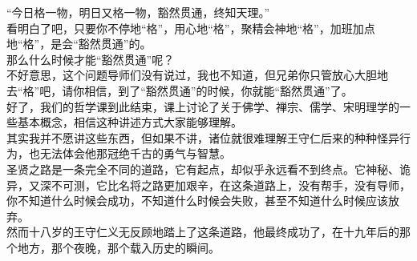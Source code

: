 \begin{multicols}{\theparacolNo}
“今日格一物，明日又格一物，豁然贯通，终知天理。”\\

看明白了吧，只要你不停地“格”，用心地“格”，聚精会神地“格”，加班加点地“格”，是会“豁然贯通”的。\\

那么什么时候才能“豁然贯通”呢？\\

不好意思，这个问题导师们没有说过，我也不知道，但兄弟你只管放心大胆地去“格”吧，请你相信，到了“豁然贯通”的时候，你就能“豁然贯通”了。\\

好了，我们的哲学课到此结束，课上讨论了关于佛学、禅宗、儒学、宋明理学的一些基本概念，相信这种讲述方式大家能够理解。\\

其实我并不愿讲这些东西，但如果不讲，诸位就很难理解王守仁后来的种种怪异行为，也无法体会他那冠绝千古的勇气与智慧。\\

圣贤之路是一条完全不同的道路，它有起点，却似乎永远看不到终点。它神秘、诡异，又深不可测，它比名将之路更加艰辛，在这条道路上，没有帮手，没有导师，你不知道什么时候会成功，不知道什么时候会失败，甚至不知道什么时候应该放弃。\\

然而十八岁的王守仁义无反顾地踏上了这条道路，他最终成功了，在十九年后的那个地方，那个夜晚，那个载入历史的瞬间。\\
\ifnum{}
	\end{multicols}
\fi
\newpage
